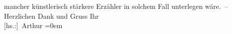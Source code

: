 \begin{ledgroupsized}[t]{13cm}
                    mancher künstlerisch stärkere Erzähler in solchem Fall unterlegen wäre. –
                    Herzlichen Dank und Gruss\pend
           \pstart
           Ihr{\\[\baselineskip]}\spacefill\mbox{{[}hs.:{]} Arthur}\pend
           \leftskip=0em{}          \endnumbering{}\end{ledgroupsized}  \newcommand{\dateiname}{L02238}\newcommand{\titel}{Arthur Schnitzler an Hugo von Hofmannsthal, 22. 8. 1916}\newcommand{\editorInnen}{Martin Anton Müller und Gerd-Hermann Susen}
      